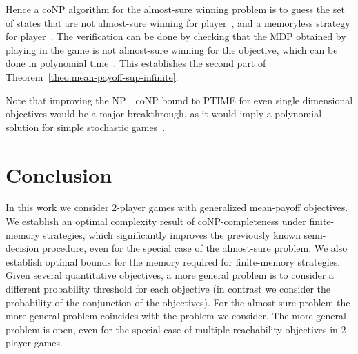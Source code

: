 \documentclass{article}
\newcommand{\half}{}
\begin{document}
Hence a coNP algorithm for the almost-sure winning problem is to guess
the set  of states that are not almost-sure winning for player~,
and a memoryless strategy  for player~. The verification can be done 
by checking that the MDP obtained by playing  in the game
is not almost-sure winning for the  objective, which can be done 
in polynomial time~\cite[Section~3.2]{BBCFK14}.
This establishes the second part of Theorem~\ref{theo:mean-payoff-sup-infinite}.



Note that improving the  NP~~coNP bound to PTIME for even single dimensional objectives
would be a major breakthrough, as it would imply a polynomial solution for
simple stochastic games~\cite{Condon92}. 

\section{Conclusion}\label{sec:con}
In this work we consider 2\half-player games with generalized mean-payoff objectives.
We establish an optimal complexity result of coNP-completeness under finite-memory 
strategies, which significantly improves the previously known semi-decision procedure, 
even for the special case of the almost-sure problem.
We also establish optimal bounds for the memory required for finite-memory strategies.
Given several quantitative objectives, a more general problem is to consider
a different probability threshold for each objective (in contrast we consider
the probability of the conjunction of the objectives).
For the almost-sure problem the more general problem coincides with the problem
we consider. 
The more general problem is open, even for the special case of  
multiple reachability objectives in 2\half-player games.





\end{document}
